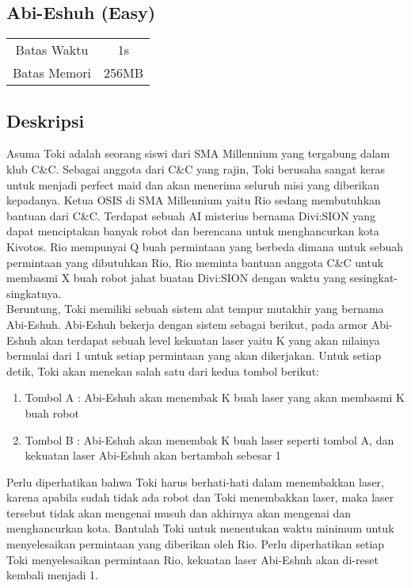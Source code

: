 \documentclass{article}
\begin{document}
\begin{center}

    
    \section*{Abi-Eshuh (Easy)} %

    \begin{tabular}{ | c c | }
        \hline
        Batas Waktu  & 1s \\    %
        Batas Memori & 256MB \\  %
        \hline
    \end{tabular}
\end{center}

\subsection*{Deskripsi}

Asuma Toki adalah seorang siswi dari SMA Millennium yang tergabung dalam klub C\&C. Sebagai anggota dari C\&C yang rajin, Toki berusaha sangat keras untuk menjadi perfect maid dan akan menerima seluruh misi yang diberikan kepadanya. Ketua OSIS di SMA Millennium yaitu Rio sedang membutuhkan bantuan dari C\&C. Terdapat sebuah AI misterius bernama Divi:SION yang dapat menciptakan banyak robot dan berencana untuk menghancurkan kota Kivotos. Rio mempunyai Q buah permintaan yang berbeda dimana untuk sebuah permintaan yang dibutuhkan Rio, Rio meminta bantuan anggota C\&C untuk membasmi X buah robot jahat buatan Divi:SION dengan waktu yang sesingkat-singkatnya.\\

Beruntung, Toki memiliki sebuah sistem alat tempur mutakhir yang bernama Abi-Eshuh. Abi-Eshuh bekerja dengan sistem sebagai berikut, pada armor Abi-Eshuh akan terdapat sebuah level kekuatan laser yaitu K yang akan nilainya bermulai dari 1 untuk setiap permintaan yang akan dikerjakan. Untuk setiap detik, Toki akan menekan salah satu dari kedua tombol berikut:
\begin{enumerate}
    \item Tombol A : Abi-Eshuh akan menembak K buah laser yang akan membasmi K buah robot 
    \item Tombol B : Abi-Eshuh akan menembak K buah laser seperti tombol A, dan kekuatan laser Abi-Eshuh akan bertambah sebesar 1
\end{enumerate}
Perlu diperhatikan bahwa Toki harus berhati-hati dalam menembakkan laser, karena apabila sudah tidak ada robot dan Toki menembakkan laser, maka laser tersebut tidak akan mengenai musuh dan akhirnya akan mengenai dan menghancurkan kota. Bantulah Toki untuk menentukan waktu minimum untuk menyelesaikan permintaan yang diberikan oleh Rio. Perlu diperhatikan setiap Toki menyelesaikan permintaan Rio, kekuatan laser Abi-Eshuh akan di-reset kembali menjadi 1.
\end{document}
